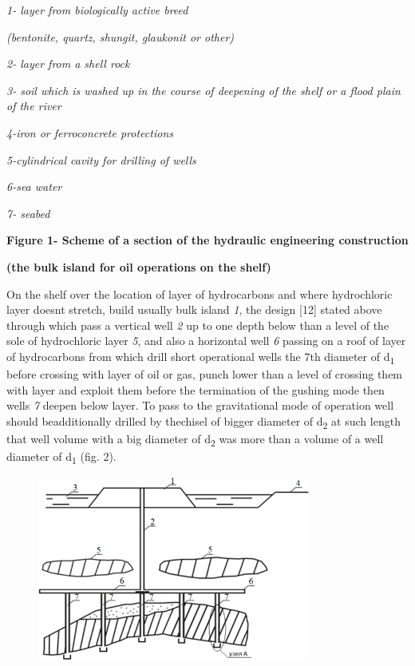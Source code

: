 \emph{1- layer from biologically active breed}

\emph{(bentonite, quartz, shungit, glaukonit or other)}

\emph{2- layer from a shell rock}

\emph{3- soil which is washed up in the course of deepening of the shelf
or a flood plain of the river}

\emph{4-iron or ferroconcrete protections}

\emph{5-cylindrical cavity for drilling of wells}

\emph{6-sea water}

\emph{7- seabed}

{\bfseries Figure 1- Scheme of a section of the hydraulic engineering
construction}

{\bfseries (the bulk island for oil operations on the shelf)}

On the shelf over the location of layer of hydrocarbons and where
hydrochloric layer doesn\textquotesingle t stretch, build usually bulk
island \emph{1}, the design {[}12{]} stated above through which pass a
vertical well \emph{2} up to one depth below than a level of the sole of
hydrochloric layer \emph{5}, and also a horizontal well \emph{6} passing
on a roof of layer of hydrocarbons from which drill short operational
wells the 7th diameter of d\textsubscript{1} before crossing with layer
of oil or gas, punch lower than a level of crossing them with layer and
exploit them before the termination of the gushing mode then wells
\emph{7} deepen below layer. To pass to the gravitational mode of
operation well should beadditionally drilled by thechisel of bigger
diameter of d\textsubscript{2} at such length that well volume with a
big diameter of d\textsubscript{2} was more than a volume of a well
diameter of d\textsubscript{1} (fig. 2).

\begin{figure}[H]
	\centering
	\includegraphics[width=0.8\textwidth]{assets/1340}
	\caption*{}
\end{figure}

